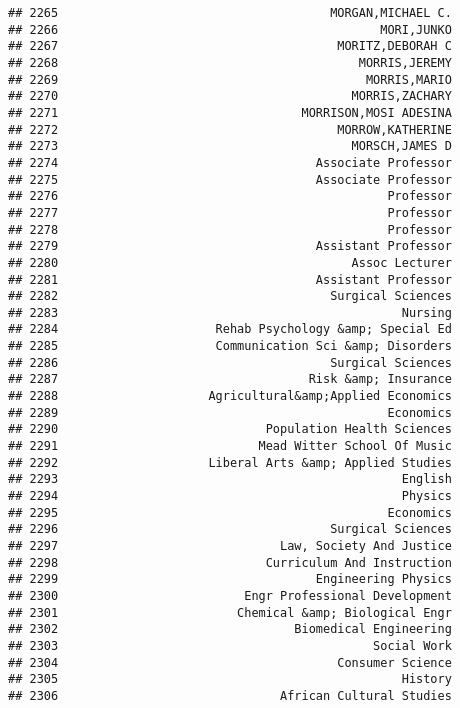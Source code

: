 \documentclass[
]{article}
\begin{document}
\begin{verbatim}
## 2265                                      MORGAN,MICHAEL C.
## 2266                                             MORI,JUNKO
## 2267                                       MORITZ,DEBORAH C
## 2268                                          MORRIS,JEREMY
## 2269                                           MORRIS,MARIO
## 2270                                         MORRIS,ZACHARY
## 2271                                  MORRISON,MOSI ADESINA
## 2272                                       MORROW,KATHERINE
## 2273                                         MORSCH,JAMES D
## 2274                                    Associate Professor
## 2275                                    Associate Professor
## 2276                                              Professor
## 2277                                              Professor
## 2278                                              Professor
## 2279                                    Assistant Professor
## 2280                                         Assoc Lecturer
## 2281                                    Assistant Professor
## 2282                                      Surgical Sciences
## 2283                                                Nursing
## 2284                      Rehab Psychology &amp; Special Ed
## 2285                      Communication Sci &amp; Disorders
## 2286                                      Surgical Sciences
## 2287                                   Risk &amp; Insurance
## 2288                     Agricultural&amp;Applied Economics
## 2289                                              Economics
## 2290                             Population Health Sciences
## 2291                            Mead Witter School Of Music
## 2292                     Liberal Arts &amp; Applied Studies
## 2293                                                English
## 2294                                                Physics
## 2295                                              Economics
## 2296                                      Surgical Sciences
## 2297                               Law, Society And Justice
## 2298                             Curriculum And Instruction
## 2299                                    Engineering Physics
## 2300                          Engr Professional Development
## 2301                         Chemical &amp; Biological Engr
## 2302                                 Biomedical Engineering
## 2303                                            Social Work
## 2304                                       Consumer Science
## 2305                                                History
## 2306                               African Cultural Studies

\end{verbatim}
\end{document}
